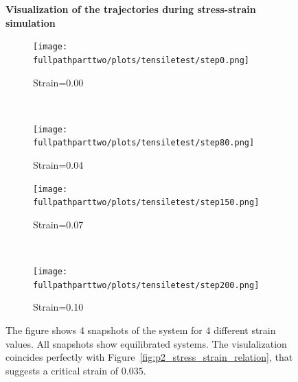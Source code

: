 \documentclass[10pt,a4paper]{report}
\def \fullpathparttwo {/home/lukas/Desktop/project/independence/atomistic_modeling/exam/2_Two-dimensional_atomic_tensile_test}
\newcommand*{\figuretitle}[1]{%
    {\centering%
    \textbf{#1}%
    \par\medskip}%
}
\begin{document}
\begin{center}
\begin{figure}[h]
\figuretitle{Visualization of the trajectories during stress-strain simulation}
\begin{subfigure}{0.5\textwidth}
  \texttt{[image: \\fullpathparttwo/plots/tensiletest/step0.png]}
  \caption{Strain=0.00}
\end{subfigure}~
\begin{subfigure}{0.5\textwidth}
  \texttt{[image: \\fullpathparttwo/plots/tensiletest/step80.png]}
  \caption{Strain=0.04}
\end{subfigure}

\begin{subfigure}{0.5\textwidth}
  \texttt{[image: \\fullpathparttwo/plots/tensiletest/step150.png]}
  \caption{Strain=0.07}
\end{subfigure}~
\begin{subfigure}{0.5\textwidth}
  \texttt{[image: \\fullpathparttwo/plots/tensiletest/step200.png]}
  \caption{Strain=0.10}
\end{subfigure}


\caption[Visualization of the trajectories during stress-strain simulation]{The figure shows 4 snapshots of the system for 4 different strain values. All snapshots show equilibrated systems. The visulalization coincides perfectly with Figure~\ref{fig:p2_stress_strain_relation}, that suggests a critical strain of $0.035$.}
\label{fig:p2_stress_strain_relation_snapshots}
\end{figure}
\end{center}
\end{document}
